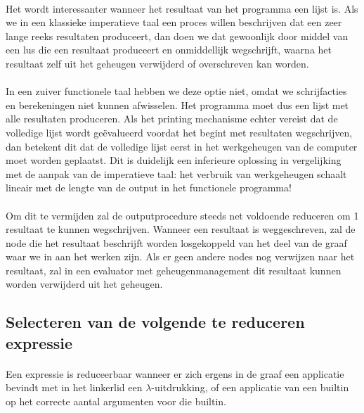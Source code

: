 \documentclass[a4paper,10pt]{article}
\begin{document}
\paragraph{}
Het wordt interessanter wanneer het resultaat van het programma een lijst is.
Als we in een klassieke imperatieve taal een proces willen beschrijven dat een zeer lange reeks resultaten produceert, dan doen we dat gewoonlijk door middel van een lus die een resultaat produceert en onmiddellijk wegschrijft, waarna het resultaat zelf uit het geheugen verwijderd of overschreven kan worden.
\paragraph{}
In een zuiver functionele taal hebben we deze optie niet, omdat we schrijfacties en berekeningen niet kunnen afwisselen.
Het programma moet dus een lijst met alle resultaten produceren.
Als het printing mechanisme echter vereist dat de volledige lijst wordt ge{\"e}valueerd voordat het begint met resultaten wegschrijven, dan betekent dit dat de volledige lijst eerst in het werkgeheugen van de computer moet worden geplaatst.
Dit is duidelijk een inferieure oplossing in vergelijking met de aanpak van de imperatieve taal: het verbruik van werkgeheugen schaalt lineair met de lengte van de output in het functionele programma!
\paragraph{}
Om dit te vermijden zal de outputprocedure steeds net voldoende reduceren om 1 resultaat te kunnen wegschrijven.
Wanneer een resultaat is weggeschreven, zal de node die het resultaat beschrijft worden losgekoppeld van het deel van de graaf waar we in aan het werken zijn.
Als er geen andere nodes nog verwijzen naar het resultaat, zal in een evaluator met geheugenmanagement dit resultaat kunnen worden verwijderd uit het geheugen.


\subsection{Selecteren van de volgende te reduceren expressie}
\paragraph{}
Een expressie is reduceerbaar wanneer er zich ergens in de graaf een applicatie bevindt met in het linkerlid een $\lambda$-uitdrukking, of een applicatie van een builtin op het correcte aantal argumenten voor die builtin.
\end{document}
